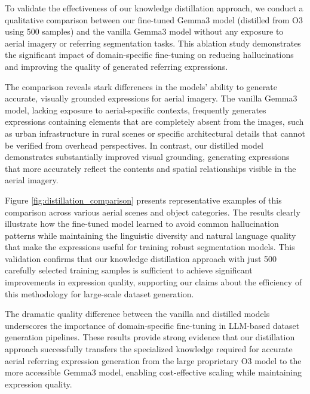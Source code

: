 To validate the effectiveness of our knowledge distillation approach, we conduct a qualitative comparison between our fine-tuned Gemma3 model (distilled from O3 using 500 samples) and the vanilla Gemma3 model without any exposure to aerial imagery or referring segmentation tasks. This ablation study demonstrates the significant impact of domain-specific fine-tuning on reducing hallucinations and improving the quality of generated referring expressions.

The comparison reveals stark differences in the models' ability to generate accurate, visually grounded expressions for aerial imagery. The vanilla Gemma3 model, lacking exposure to aerial-specific contexts, frequently generates expressions containing elements that are completely absent from the images, such as urban infrastructure in rural scenes or specific architectural details that cannot be verified from overhead perspectives. In contrast, our distilled model demonstrates substantially improved visual grounding, generating expressions that more accurately reflect the contents and spatial relationships visible in the aerial imagery.

Figure \ref{fig:distillation_comparison} presents representative examples of this comparison across various aerial scenes and object categories. The results clearly illustrate how the fine-tuned model learned to avoid common hallucination patterns while maintaining the linguistic diversity and natural language quality that make the expressions useful for training robust segmentation models. This validation confirms that our knowledge distillation approach with just 500 carefully selected training samples is sufficient to achieve significant improvements in expression quality, supporting our claims about the efficiency of this methodology for large-scale dataset generation.

The dramatic quality difference between the vanilla and distilled models underscores the importance of domain-specific fine-tuning in LLM-based dataset generation pipelines. These results provide strong evidence that our distillation approach successfully transfers the specialized knowledge required for accurate aerial referring expression generation from the large proprietary O3 model to the more accessible Gemma3 model, enabling cost-effective scaling while maintaining expression quality.

